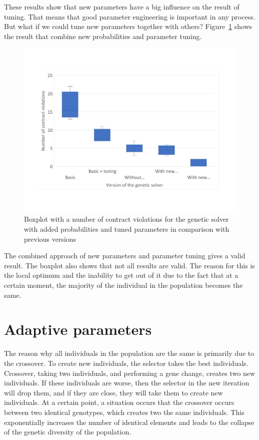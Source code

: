 These results show that new parameters have a big influence on the result of tuning. That means that good parameter engineering is important in any process.  But what if we could tune new parameters together with others?
Figure~\ref{fig:boxplotsolverNewParametersTuning} shows the result that combine new probabilities and parameter tuning.
\begin{figure}
	\centering
	\includegraphics[width=\textwidth]{images/BoxPlotSolverNewParametersTuning.pdf}
	\caption[Boxplot with a number of contract violations for the genetic solver with added probabilities and tuned parameters in comparison with previous versions]{Boxplot with a number of contract violations for the genetic solver with added probabilities and tuned parameters in comparison with previous versions}
	\label{fig:boxplotsolverNewParametersTuning}
\end{figure}

The combined approach of new parameters and parameter tuning gives a valid result. The boxplot also shows that not all results are valid. The reason for this is the local optimum and the inability to get out of it due to the fact that at a certain moment, the majority of the individual in the population becomes the same. 

\section{Adaptive parameters}
The reason why all individuals in the population are the same is primarily due to the crossover. To create new individuals, the selector takes the best individuals. Crossover, taking two individuals, and performing a gene change, creates two new individuals. If these individuals are worse, then the selector in the new iteration will drop them, and if they are close, they will take them to create new individuals. At a certain point, a situation occurs that the crossover occurs between two identical genotypes, which creates two the same individuals. This exponentially increases the number of identical elements and leads to the collapse of the genetic diversity of the population.


